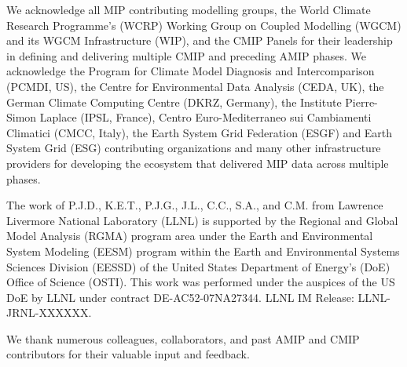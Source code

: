 \documentclass[gmd, preprint]{copernicus}
\begin{document}
\appendixtables   %







\begin{acknowledgements}

We acknowledge all MIP contributing modelling groups, the World Climate Research Programme's (WCRP) Working Group on Coupled Modelling (WGCM) and its WGCM Infrastructure (WIP), and the CMIP Panels for their leadership in defining and delivering multiple CMIP and preceding AMIP phases. We acknowledge the Program for Climate Model Diagnosis and Intercomparison (PCMDI, US), the Centre for Environmental Data Analysis (CEDA, UK), the German Climate Computing Centre (DKRZ, Germany), the Institute Pierre-Simon Laplace (IPSL, France), Centro Euro-Mediterraneo sui Cambiamenti Climatici (CMCC, Italy), the Earth System Grid Federation (ESGF) and Earth System Grid (ESG) contributing organizations and many other infrastructure providers for developing the ecosystem that delivered MIP data across multiple phases.

The work of P.J.D., K.E.T., P.J.G., J.L., C.C., S.A., and C.M. from Lawrence Livermore National Laboratory (LLNL) is supported by the Regional and Global Model Analysis (RGMA) program area under the Earth and Environmental System Modeling (EESM) program within the Earth and Environmental Systems Sciences Division (EESSD) of the United States Department of Energy’s (DoE) Office of Science (OSTI). This work was performed under the auspices of the US DoE by LLNL under contract DE-AC52-07NA27344. LLNL IM Release: LLNL-JRNL-XXXXXX.

We thank numerous colleagues, collaborators, and past AMIP and CMIP contributors for their valuable input and feedback.

\end{acknowledgements}
\end{document}
